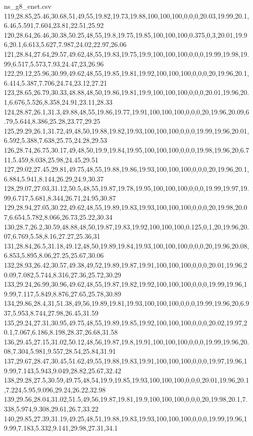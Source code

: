 \begin{filecontents*}[overwrite]{ns_g8_enet.csv}
119,28.85,25.46,30.68,51,49,55,19.82,19.73,19.88,100,100,100,0,0,0,20.03,19.99,20.1,6.46,5.591,7.604,23.81,22.51,25.92
120,28.64,26.46,30.38,50.25,48,55,19.8,19.75,19.85,100,100,100,0.375,0,3,20.01,19.96,20.1,6.613,5.627,7.987,24.02,22.97,26.06
121,28.84,27.64,29.57,49.62,48,55,19.83,19.75,19.9,100,100,100,0,0,0,19.99,19.98,19.99,6.517,5.573,7.93,24.47,23,26.96
122,29.12,25.96,30.99,49.62,48,55,19.85,19.81,19.92,100,100,100,0,0,0,20,19.96,20.1,6.414,5.387,7.706,24.74,23.12,27.21
123,28.65,26.79,30.33,48.88,48,50,19.86,19.81,19.9,100,100,100,0,0,0,20.01,19.96,20.1,6.676,5.526,8.358,24.91,23.11,28.33
124,28.87,26.1,31.3,49.88,48,55,19.86,19.77,19.91,100,100,100,0,0,0,20,19.96,20.09,6.79,5.644,8.386,25.28,23.77,29.25
125,29.29,26.1,31.72,49,48,50,19.88,19.82,19.93,100,100,100,0,0,0,19.99,19.96,20.01,6.592,5.388,7.638,25.75,24.28,29.53
126,28.74,26.75,30.17,49,48,50,19.9,19.84,19.95,100,100,100,0,0,0,19.98,19.96,20,6.711,5.459,8.038,25.98,24.45,29.51
127,29.02,27.45,29.81,49.75,48,55,19.88,19.86,19.93,100,100,100,0,0,0,20,19.96,20.1,6.884,5.941,8.144,26.29,24.9,30.37
128,29.07,27.03,31.12,50.5,48,55,19.87,19.78,19.95,100,100,100,0,0,0,19.99,19.97,19.99,6.717,5.681,8.344,26.71,24.95,30.87
129,28.94,27.05,30.22,49.62,48,55,19.89,19.83,19.93,100,100,100,0,0,0,20,19.98,20.07,6.654,5.782,8.066,26.73,25.22,30.34
130,28.7,26.2,30.59,48.88,48,50,19.87,19.83,19.92,100,100,100,0.125,0,1,20,19.96,20.07,6.769,5.58,8.16,27.27,25.36,31
131,28.84,26.5,31.18,49.12,48,50,19.89,19.84,19.93,100,100,100,0,0,0,20,19.96,20.08,6.853,5.895,8.06,27.25,25.67,30.06
132,28.93,26.42,30.57,49.38,49,52,19.89,19.87,19.91,100,100,100,0,0,0,20.01,19.96,20.09,7.082,5.744,8.316,27.36,25.72,30.29
133,29.24,26.99,30.96,49.62,48,55,19.87,19.82,19.92,100,100,100,0,0,0,19.99,19.96,19.99,7.117,5.849,8.876,27.65,25.78,30.89
134,29.86,28.4,31,51.38,49,56,19.89,19.81,19.93,100,100,100,0,0,0,19.99,19.96,20,6.937,5.953,8.744,27.98,26.45,31.59
135,29.24,27.31,30.95,49.75,48,55,19.89,19.85,19.92,100,100,100,0,0,0,20.02,19.97,20.1,7.067,6.186,8.198,28.37,26.68,31.58
136,29.45,27.15,31.02,50.12,48,56,19.87,19.8,19.91,100,100,100,0,0,0,19.99,19.96,20.08,7.304,5.981,9.557,28.54,25.84,31.91
137,29.67,28.47,30.45,51.62,49,55,19.88,19.83,19.91,100,100,100,0,0,0,19.97,19.96,19.99,7.143,5.943,9.049,28.82,25.67,32.42
138,29.28,27.5,30.59,49.75,48,54,19.9,19.85,19.93,100,100,100,0,0,0,20.01,19.96,20.1,7.224,5.95,9.096,29.24,26.22,32.98
139,29.56,28.04,31.02,51.5,49,56,19.87,19.81,19.9,100,100,100,0,0,0,20,19.98,20.1,7.338,5.974,9.308,29.61,26.7,33.22
140,29.85,27.39,31.19,49.25,48,51,19.88,19.83,19.93,100,100,100,0,0,0,19.99,19.96,19.99,7.183,5.332,9.141,29.98,27.31,34.1

\end{filecontents*}
